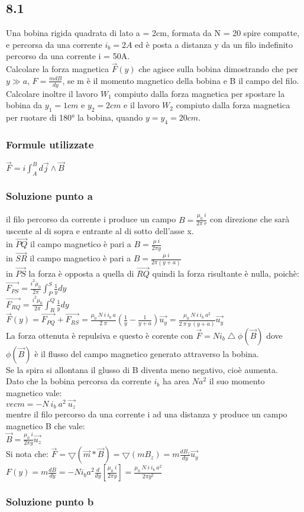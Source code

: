 \documentclass[../../main.tex]{subfiles}
\begin{document}
\subsection*{8.1}
Una bobina rigida quadrata di lato a = 2cm, formata da N = 20 spire compatte, e percorsa da una corrente $i_b = 2A$ ed è posta a distanza y da un filo indefinito percorso da una corrente i = 50A.
\\Calcolare la forza magnetica $\vec{F}(y) $ che agisce sulla bobina dimostrando che per $y \gg a$, $F=\frac{mdB}{dy}$, se m è il momento magnetico della bobina e B il campo del filo.
\\Calcolare inoltre il lavoro $W_1$ compiuto dalla forza magnetica per spostare la bobina da $y_1=1cm$ e $y_2 = 2cm$ e il lavoro $W_2$ compiuto dalla forza magnetica per ruotare di 180° la bobina, quando $y=y_4=20cm$.
\subsubsection*{Formule utilizzate}
$\vec{F} = i\int_A^Bd\vec{j}\wedge\vec{B}$
\subsubsection*{Soluzione punto a}
il filo percorso da corrente i produce un campo $B = \frac{\mu_0\ i}{2\pi\ r}$ con direzione che sarà uscente al di sopra e entrante al di sotto dell'asse x.
\\in $\vec{PQ}$ il campo magnetico è pari a $B = \frac{\mu\ i}{2\pi y}$
\\in $\vec{SR}$ il campo magnetico è pari a $B = \frac{\mu\ i}{2\pi (y+a)}$
\\in $\vec{PS}$ la forza è opposta a quella di $\vec{RQ}$ quindi la forza risultante è nulla, poichè:
\\$\vec{F_{PS}} = \frac{i^2\mu_0}{2\pi}\int_P^S\frac{1}{y}dy$
\\$\vec{F_{RQ}} = \frac{i^2\mu_0}{2\pi}\int_R^Q\frac{1}{y}dy$
\\$\vec{F}(y) = \vec{F_{PQ}} + \vec{F_{RS}} = \frac{\mu_0\ N\ i\ i_b\ a}{2\ \pi}\left(\frac{1}{y}-\frac{1}{y+a}\right)\vec{u_y} = \frac{\mu_0\ N\ i\ i_b\ a^2}{2\ \pi\ y\ (y+a)}\vec{u_y}$
\\La forza ottenuta è repulsiva e questo è corente con $\vec{F} = N i_b \bigtriangleup\phi(\vec{B})$ dove $\phi(\vec{B})$ è il flusso del campo magnetico generato attraverso la bobina.
\\Se la spira si allontana il glusso di B diventa meno negativo, cioè aumenta.
\\Dato che la bobina percorsa da corrente $i_b$ ha area $Na^2$ il suo momento magnetico vale:
\\$vec{m} = -N\ i_b\ a^2\ \vec{u_z}$
\\mentre il filo percorso da una corrente i ad una distanza y produce un campo magnetico B che vale:
\\$\vec{B} = \frac{\mu_0\ i}{2\pi y}\vec{u_z}$
\\Si nota che: $\vec{F} = \bigtriangledown(\vec{m} * \vec{B}) = \bigtriangledown(mB_z) = m\frac{dB_z}{dy}\vec{u_y}$
\\$F(y) = m\frac{dB}{dy} = -Ni_ba^2\frac{d}{dy}\left[\frac{\mu_0\ i}{2\pi y}\right] = \frac{\mu_0\ N\ i\ i_b\ a^2}{2\pi y^2}$

\subsubsection*{Soluzione punto b}
\newpage
\end{document}
